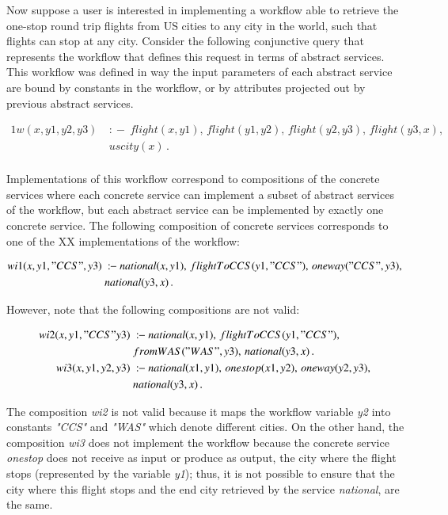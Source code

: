 \documentclass{llncs}
\newcommand{\qrule}{:\!\!-}
\begin{document}
Now suppose a user is interested in implementing a workflow able to retrieve the one-stop round trip flights from US cities to any city in the world, such that flights can stop at any city. 
Consider the following conjunctive query that represents the workflow that defines this request in terms of abstract services. This workflow was defined in way the input parameters of each abstract service are bound by  constants in the workflow, or by attributes projected out by  previous abstract services.

\begin{alignat*}{1}
w(x,y1,y2,y3)\ &\qrule\ flight(x,y1),\, flight(y1,y2),\,  flight(y2,y3),\,  flight(y3,x),\,  \\
                   \ & uscity(x)\,. \\
\end{alignat*}

Implementations of this workflow correspond to compositions of the concrete services where each concrete service can implement a subset of abstract services of the workflow, but each abstract service can be implemented by exactly one concrete service. The following composition of concrete services corresponds to one of the XX implementations of the workflow:

\begin{alignat*}{1}
wi1(x,y1,"CCS",y3)\ &\qrule\ national(x,y1),\, flightToCCS(y1,"CCS"),\,  oneway("CCS",y3),\,  \\
\ & national(y3,x)\,.  \\
\end{alignat*}

However, note that the following compositions are not valid:


\begin{alignat*}{1}
wi2(x,y1,"CCS"y3)\ &\qrule\ national(x,y1),\, flightToCCS(y1,"CCS"),\, \\
\ & fromWAS("WAS",y3),\,  national(y3,x)\,. \\
wi3(x,y1,y2,y3)\ &\qrule\ national(x1,y1),\, onestop(x1,y2),\,  oneway(y2,y3),\,  \\
\ & national(y3,x)\,. \\
\end{alignat*}

The composition {\it wi2} is not valid because  it maps the workflow variable
{\it y2} into constants {\it "CCS"} and {\it "WAS"} which denote different cities.
On the other hand, the composition {\it wi3} does not implement the workflow because the concrete service  {\it onestop} does not receive as input or produce as output, the city where the flight stops (represented by the variable {\it y1}); thus, it is not possible to ensure that the city where this flight stops and the end city  retrieved by the service {\it national}, are the same.
\end{document}

